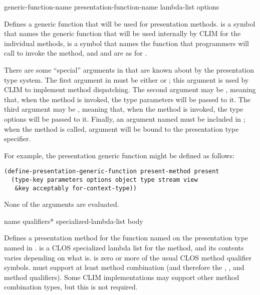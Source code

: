  {generic-function-name 
                                                  presentation-function-name
                                                  lambda-list \rest options}

Defines a generic function that will be used for presentation methods.
 is a symbol that names the generic function that
will be used internally by CLIM for the individual methods,
 is a symbol that names the function that
programmers will call to invoke the method, and  and
 are as for .

There are some ``special'' arguments in  that are known about
by the presentation type system.  The first argument in  must
be either  or ; this argument is used by CLIM to
implement method dispatching.  The second argument may be ,
meaning that, when the method is invoked, the type parameters will be passed to
it.  The third argument may be , meaning that, when the method is
invoked, the type options will be passed to it.  Finally, an argument named
 must be included in ; when the method is called,
 argument will be bound to the presentation type specifier.

For example, the  presentation generic function might be defined as
follows:
\begin{verbatim}
(define-presentation-generic-function present-method present
  (type-key parameters options object type stream view
   &key acceptably for-context-type))
\end{verbatim}

None of the arguments are evaluated.


 {name qualifiers* specialized-lambda-list \body body}

Defines a presentation method for the function named  on the
presentation type named in .
 is a CLOS specialized lambda list for the method,
and its contents varies depending on what  is.   is
zero or more of the usual CLOS method qualifier symbols.
 must support at least  method
combination (and therefore the , , and 
method qualifiers).  Some CLIM implementations may support other method
combination types, but this is not required.

